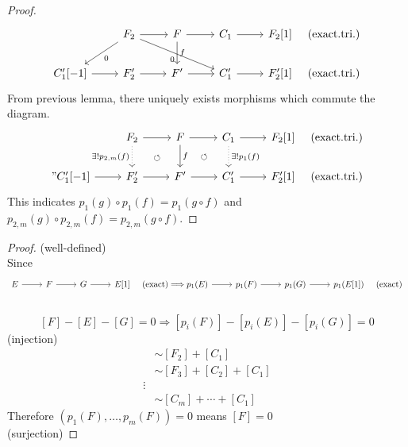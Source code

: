 \documentclass[leqno]{ltjsarticle}
\begin{document}
\begin{proof}
	\[
	\begin{tikzcd}
		&F_{2}\ar[ld,"0"]\ar[rrd,swap,"0"]\ar[r]&F\ar[r]\ar[d,"f"]&C_{1}\ar[r]&F_2[1]\hspace{5mm} \text{(exact.tri.)}\\
		C'_1[-1]\ar[r]&F'_{2}\ar[r]&F'\ar[r]&C'_{1}\ar[r]&F'_2[1]\hspace{5mm} \text{(exact.tri.)}
	\end{tikzcd}
\]
From previous lemma, there uniquely exists morphisms which commute the diagram.
	\[
	\begin{tikzcd}
		&F_{2}\ar[d,dotted,swap,"\exists !p_{2,m}(f)"]\ar[r]&F\ar[r]\ar[d,"f"]&C_{1}\ar[d,dotted,"\exists !p_1(f)"]\ar[r]&F_2[1]\hspace{5mm} \text{(exact.tri.)}\\
	"	C'_1[-1]\ar[r]&F'_{2}\ar[r]&F'\ar[r]&C'_{1}\ar[r]&F'_2[1]\hspace{5mm} \text{(exact.tri.)}
	\arrow[draw=none, from=1-2, to=2-3,shift right=3,"\circlearrowleft"]
	\arrow[draw=none, from=1-3, to=2-4,shift right=3,"\circlearrowleft"]
	\end{tikzcd}
\]
This indicates $p_1(g)\circ p_1(f) = p_1(g\circ f)$ and $p_{2,m}(g)\circ p_{2,m}(f) = p_{2,m}(g\circ f)$.
\end{proof}

\begin{proof}
	(well-defined)\\
	Since 
	\[\begin{tikzcd}
		E\ar[r]& F\ar[r]&G\ar[r]& E[1] \hspace{5mm}\text{(exact)}\Longrightarrow p_1(E)\ar[r]&p_1(F)\ar[r]&p_1(G)\ar[r]&p_1(E[1])\hspace{5mm}\text{(exact)}\\
	\end{tikzcd}\]
	\[ [F]-[E]-[G]=0\Longrightarrow [p_i(F)] - [p_i(E)] - [p_i(G)] = 0\]
	(injection)\\
	\begin{align*}
		[F]&\sim [F_2] + [C_1]\\
			&\sim [F_3] + [C_2] + [C_1] \\
			\vdots\\
			&\sim [C_m] + \cdots + [C_1]
	\end{align*}
	Therefore $(p_1(F),\ldots, p_m(F)) = 0$ means $[F] = 0$\\
	(surjection)
\end{proof}
\end{document}

